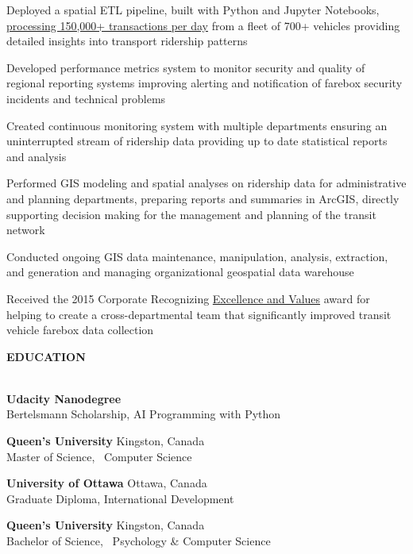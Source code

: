 \documentclass[letterpaper]{article}
\newcommand{\lineunder} {
        \vspace*{-8pt} \\
        \hspace*{-18pt} \hrulefill \\
    }
\newcommand{\header} [1] {
        \vspace{9pt}
        {\hspace*{-18pt}\vspace*{6pt} \large \textbf {#1}}
        \vspace*{-6pt} \lineunder
        \vspace{2pt}
    }
\newenvironment{jobtasklist}
        {
            \vspace{-12pt}
            \begin{itemize} \itemsep 0pt
        }{
            \end{itemize}
            \vspace{-3pt}
        }
\newcommand{\university}[3]{
        \textbf{#1}  %
        \hfill #2\\  %
        #3\\         %
        \vspace{2mm}
    }
\newcommand{\impt}[1]{\uline{#1}}
\begin{document}
\begin{jobtasklist}
{        \item Deployed a spatial ETL pipeline, built with Python and Jupyter Notebooks,
                \impt{processing 150,000+ transactions per day} from a fleet of 700+ vehicles
                providing detailed insights into transport ridership patterns

        \item Developed performance metrics system to monitor security and quality
                of regional reporting systems improving alerting and notification of
                farebox security incidents and technical problems

        \item Created continuous monitoring system with multiple departments
                ensuring an uninterrupted stream of ridership data
                providing up to date statistical reports and analysis

        \item Performed GIS modeling and spatial analyses on ridership data for administrative
                and planning departments, preparing reports and summaries in ArcGIS,
                directly supporting decision making for the management and planning of the
                transit network

        \item Conducted ongoing GIS data maintenance, manipulation, analysis, extraction, and generation
                and managing organizational geospatial data warehouse

        \item Received the 2015 Corporate Recognizing \impt{Excellence and Values} award
                for helping to create a cross-departmental team that significantly
                improved transit vehicle farebox data collection
    }


\end{jobtasklist}



\header{EDUCATION}
    \university
        {Udacity Nanodegree}
        {}
        {Bertelsmann Scholarship, AI Programming with Python}
    \university
        {Queen's University}
        {Kingston, Canada}
        {Master of Science, ~Computer Science}

    \university
        {University of Ottawa}
        {Ottawa, Canada}
        {Graduate Diploma, International Development}

    \university
        {Queen's University}
        {Kingston, Canada}
        {Bachelor of Science, ~Psychology \& Computer Science}
\end{document}
